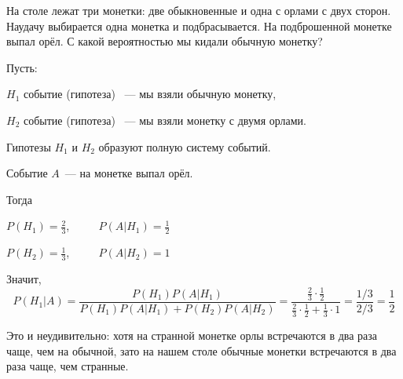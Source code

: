 \documentclass[11pt]{article}
\begin{document}
\begin{example}
    На столе лежат три монетки: две обыкновенные и одна с орлами с двух сторон.
    Наудачу выбирается одна монетка и подбрасывается. На подброшенной монетке
    выпал орёл. С какой вероятностью мы кидали обычную монетку?
    
    Пусть:
    
    \nopagebreak
    $H_1$ событие (гипотеза) ~--- мы взяли обычную монетку,
    
    \nopagebreak
    $H_2$ событие (гипотеза) ~--- мы взяли монетку с двумя орлами.
    
    Гипотезы $H_1$ и $H_2$ образуют полную систему событий.
    
    Событие $A$~--- на монетке выпал орёл.
    
    Тогда
	
    \nopagebreak
    \vspace{0.2em}

    \nopagebreak
    $P(H_1)=\frac{2}{3}$, ~~~~ $P(A \vert H_1)=\frac{1}{2}$

    \nopagebreak
    \vspace{0.2em}

    \nopagebreak
    $P(H_2)=\frac{1}{3}$, ~~~~ $P(A \vert H_2)=1$

    \vspace{0.2em}

    Значит,
    $$
        P(H_1 \vert A)
        =\frac{P(H_1)P(A \vert H_1)}{P(H_1)P(A \vert H_1)+P(H_2)P(A \vert H_2)}
        =\frac{\frac{2}{3}\cdot\frac{1}{2}}
        {\frac{2}{3}\cdot\frac{1}{2}+\frac{1}{3}\cdot1}
        =\frac{1/3}{2/3}=\frac{1}{2}
    $$

    Это и неудивительно: хотя на странной монетке орлы встречаются в два раза чаще,
    чем на обычной, зато на нашем столе обычные монетки встречаются в два раза чаще,
    чем странные.
\end{example}
\end{document}
